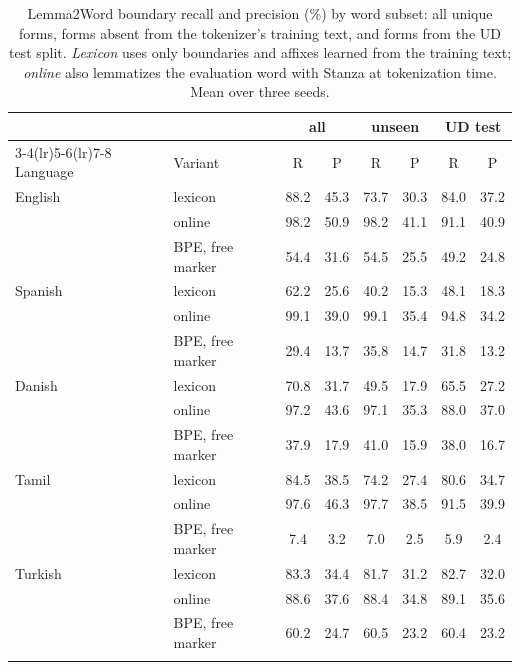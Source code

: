\begin{table}[!ht]
\centering
\caption{Lemma2Word boundary recall and precision (\%) by word subset: all unique forms, forms absent from the tokenizer's training text, and forms from the UD test split. \emph{Lexicon} uses only boundaries and affixes learned from the training text; \emph{online} also lemmatizes the evaluation word with Stanza at tokenization time. Mean over three seeds.}
\label{tab:l2w}
\small
\setlength{\tabcolsep}{3.5pt}
\begin{tabular}{llcccccc}
\toprule
 & & \multicolumn{2}{c}{all} & \multicolumn{2}{c}{unseen} & \multicolumn{2}{c}{UD test} \\
\cmidrule(lr){3-4}\cmidrule(lr){5-6}\cmidrule(lr){7-8}
Language & Variant & R & P & R & P & R & P \\
\midrule
English & lexicon & 88.2 & 45.3 & 73.7 & 30.3 & 84.0 & 37.2 \\
 & online & 98.2 & 50.9 & 98.2 & 41.1 & 91.1 & 40.9 \\
 & BPE, free marker & 54.4 & 31.6 & 54.5 & 25.5 & 49.2 & 24.8 \\
\addlinespace[2pt]
Spanish & lexicon & 62.2 & 25.6 & 40.2 & 15.3 & 48.1 & 18.3 \\
 & online & 99.1 & 39.0 & 99.1 & 35.4 & 94.8 & 34.2 \\
 & BPE, free marker & 29.4 & 13.7 & 35.8 & 14.7 & 31.8 & 13.2 \\
\addlinespace[2pt]
Danish & lexicon & 70.8 & 31.7 & 49.5 & 17.9 & 65.5 & 27.2 \\
 & online & 97.2 & 43.6 & 97.1 & 35.3 & 88.0 & 37.0 \\
 & BPE, free marker & 37.9 & 17.9 & 41.0 & 15.9 & 38.0 & 16.7 \\
\addlinespace[2pt]
Tamil & lexicon & 84.5 & 38.5 & 74.2 & 27.4 & 80.6 & 34.7 \\
 & online & 97.6 & 46.3 & 97.7 & 38.5 & 91.5 & 39.9 \\
 & BPE, free marker & 7.4 & 3.2 & 7.0 & 2.5 & 5.9 & 2.4 \\
\addlinespace[2pt]
Turkish & lexicon & 83.3 & 34.4 & 81.7 & 31.2 & 82.7 & 32.0 \\
 & online & 88.6 & 37.6 & 88.4 & 34.8 & 89.1 & 35.6 \\
 & BPE, free marker & 60.2 & 24.7 & 60.5 & 23.2 & 60.4 & 23.2 \\
\addlinespace[2pt]
\bottomrule
\end{tabular}
\end{table}
